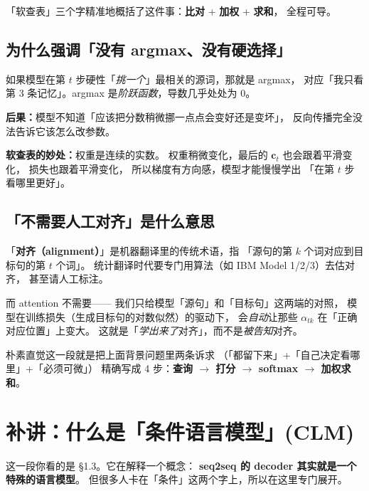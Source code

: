 \documentclass[11pt,a4paper]{ctexart}
\newcommand{\vect}[1]{\boldsymbol{#1}}
\begin{document}
「软查表」三个字精准地概括了这件事：\textbf{比对} + \textbf{加权} + \textbf{求和}，
全程可导。

\subsection{为什么强调「没有 argmax、没有硬选择」}

\begin{intuitionblock}
如果模型在第 $t$ 步硬性「\emph{挑一个}」最相关的源词，那就是 argmax，
对应「我只看第 3 条记忆」。argmax 是\emph{阶跃函数}，导数几乎处处为 0。

\textbf{后果：}模型不知道「应该把分数稍微挪一点点会变好还是变坏」，
反向传播完全没法告诉它该怎么改参数。

\textbf{软查表的妙处：}权重是连续的实数。
权重稍微变化，最后的 $\vect{c}_t$ 也会跟着平滑变化，
损失也跟着平滑变化，
所以梯度有方向感，模型才能慢慢学出
「在第 $t$ 步看哪里更好」。
\end{intuitionblock}

\subsection{「不需要人工对齐」是什么意思}

「\textbf{对齐（alignment）}」是机器翻译里的传统术语，指
「源句的第 $k$ 个词对应到目标句的第 $t$ 个词」。
统计翻译时代要专门用算法（如 IBM Model 1/2/3）去估对齐，
甚至请人工标注。

而 attention 不需要——
我们只给模型「源句」和「目标句」这两端的对照，
模型在训练损失（生成目标句的对数似然）的驱动下，
会\emph{自动}让那些 $\alpha_{tk}$ 在「正确对应位置」上变大。
这就是「\emph{学出来了}对齐」，而不是\emph{被告知}对齐。

\begin{keypointblock}
朴素直觉这一段就是把上面背景问题里两条诉求
（「都留下来」+「自己决定看哪里」+「必须可微」）
精确写成 4 步：\textbf{查询 $\to$ 打分 $\to$ softmax $\to$ 加权求和}。
\end{keypointblock}

\section{补讲：什么是「条件语言模型」(CLM)}

这一段你看的是 §1.3。它在解释一个概念：
\textbf{seq2seq 的 decoder 其实就是一个特殊的语言模型}。
但很多人卡在「条件」这两个字上，所以在这里专门展开。
\end{document}
